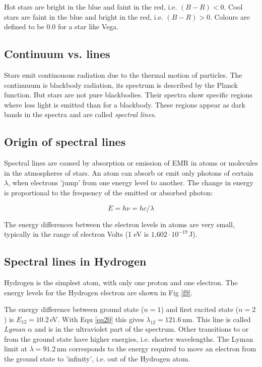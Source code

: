 Hot stars are bright in the blue and faint in the red, i.e. $(B-R)<0$. Cool stars are faint in the blue and bright in the red, i.e. $(B-R)>0$. Colours are defined to be 0.0 for a star like Vega.

\subsection{Continuum vs. lines}

Stars emit continouous radiation due to the thermal motion of particles. The continuuum is blackbody radiation, its spectrum is described by the Planck function. But stars are not pure blackbodies. Their spectra show specific regions where less light is emitted than for a blackbody. These regions appear as dark bands in the spectra and are called \textit{spectral lines}.

\subsection{Origin of spectral lines}

Spectral lines are caused by absorption or emission of EMR in atoms or molecules in the atmospheres of stars. An atom can absorb or emit only photons of certain $\lambda$, when electrons 'jump' from one energy level to another. The change in energy is proportional to the frequency of the emitted or absorbed photon:

\begin{equation}
E = h \nu = h c / \lambda
\label{eq20}
\end{equation}

The energy differences between the electron levels in atoms are very small, typically in the range of electron Volts (1 eV is $1.602 \cdot 10^{-19}$\,J).

\subsection{Spectral lines in Hydrogen}

Hydrogen is the simplest atom, with only one proton and one electron. The energy levels for the Hydrogen electron are shown in Fig \ref{f9}.

The energy difference between ground state ($n=1$) and first excited state  ($n=2$) is $E_{12} = 10.2$\,eV. With Equ \eqref{eq20} this gives $\lambda_{12} = 121.6$\,nm. This line is called \textit{Lyman $\alpha$} and is in the ultraviolet part of the spectrum. Other transitions to or from the ground state have higher energies, i.e. shorter wavelengths. The Lyman limit at $\lambda = 91.2$\,nm corresponds to the energy required to move an electron from the ground state to 'infinity', i.e. out of the Hydrogen atom.

